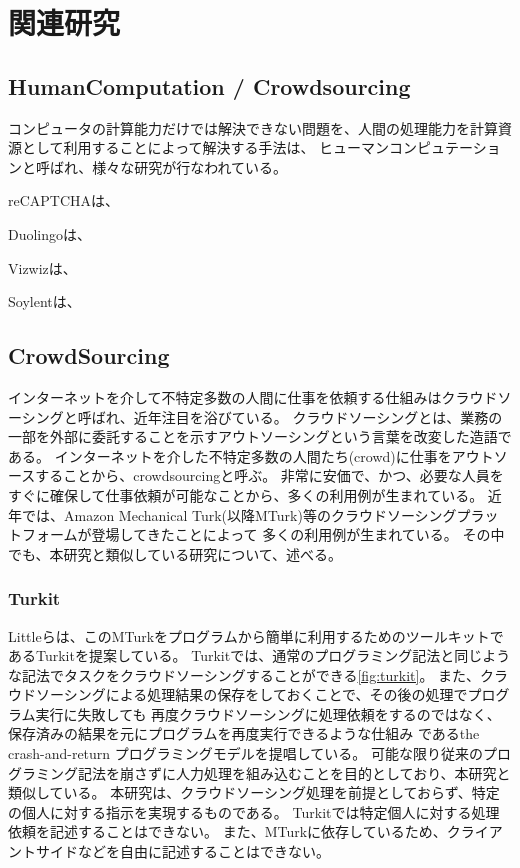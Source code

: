 \chapter{関連研究}\label{chap:related}

\section{HumanComputation /
Crowdsourcing}\label{humancomputation-crowdsourcing}

コンピュータの計算能力だけでは解決できない問題を、人間の処理能力を計算資源として利用することによって解決する手法は、
ヒューマンコンピュテーション\cite{humancomputation}と呼ばれ、様々な研究が行なわれている。

reCAPTCHA\cite{recaptcha}は、

Duolingo\cite{duolingo}は、

Vizwiz\cite{vizwiz}は、

Soylent\cite{soylent}は、

\section{CrowdSourcing}\label{crowdsourcing}

インターネットを介して不特定多数の人間に仕事を依頼する仕組みはクラウドソーシングと呼ばれ、近年注目を浴びている。
クラウドソーシングとは、業務の一部を外部に委託することを示すアウトソーシングという言葉を改変した造語である\cite{riseofcrowdsourcing}。
インターネットを介した不特定多数の人間たち(crowd)に仕事をアウトソースすることから、crowdsourcingと呼ぶ。
非常に安価で、かつ、必要な人員をすぐに確保して仕事依頼が可能なことから、多くの利用例が生まれている。
近年では、Amazon Mechanical
Turk\cite{amt}(以降MTurk)等のクラウドソーシングプラットフォームが登場してきたことによって
多くの利用例が生まれている。
その中でも、本研究と類似している研究について、述べる。

\subsection{Turkit}\label{subsubsec:turkit}

Littleらは、このMTurkをプログラムから簡単に利用するためのツールキットであるTurkit\cite{turkit}を提案している。
Turkitでは、通常のプログラミング記法と同じような記法でタスクをクラウドソーシングすることができる\ref{fig:turkit}。
また、クラウドソーシングによる処理結果の保存をしておくことで、その後の処理でプログラム実行に失敗しても
再度クラウドソーシングに処理依頼をするのではなく、保存済みの結果を元にプログラムを再度実行できるような仕組み
であるthe crash-and-return プログラミングモデルを提唱している。
可能な限り従来のプログラミング記法を崩さずに人力処理を組み込むことを目的としており、本研究と類似している。
本研究は、クラウドソーシング処理を前提としておらず、特定の個人に対する指示を実現するものである。
Turkitでは特定個人に対する処理依頼を記述することはできない。
また、MTurkに依存しているため、クライアントサイドなどを自由に記述することはできない。

